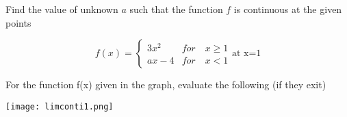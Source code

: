 \documentclass[11pt]{exam}
\begin{document}
\begin{questions}
	


\addpoints
\question[4]Find the value of unknown $a$ such that the function $f$ is continuous at the given points


\begin{center}
	\[f(x)= \begin{cases} 
	3x^2 & for \quad  x\geq 1 \\
	ax-4 & for \quad x<1 
	\end{cases}
	\mbox{at  x=1}
	\]
\end{center} 
	
\newpage

\addpoints
\question[8] For the function f(x) given in the graph, evaluate the following (if they exit)

\begin{center}
	\texttt{[image: limconti1.png]}	
\end{center}
\end{questions}
\end{document}
